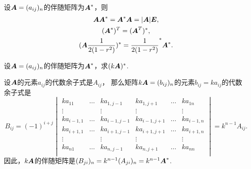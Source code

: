 \begin{theorem}
设\(\boldsymbol{A}=(a_{ij})_n\)的伴随矩阵为\(\boldsymbol{A}^*\)，则\begin{gather}
\boldsymbol{A} \boldsymbol{A}^* = \boldsymbol{A}^* \boldsymbol{A} = \abs{\boldsymbol{A}} \boldsymbol{E}, \label{equation:行列式.伴随矩阵.恒等式1} \\
(\boldsymbol{A}^*)^T = (\boldsymbol{A}^T)^*, \label{equation:行列式.伴随矩阵.恒等式2} \\
(\boldsymbol{A}\frac{1}{2(1-r^2)})^* = \frac{1}{2(1-r^2)}^* \boldsymbol{A}^*. \label{equation:行列式.伴随矩阵.恒等式3}
\end{gather}
\end{theorem}

\begin{example}
设\(\boldsymbol{A}=(a_{ij})_n\)的伴随矩阵为\(\boldsymbol{A}^*\)，求\((k\boldsymbol{A})^*\).
\begin{solution}
设\(\boldsymbol{A}\)的元素\(a_{ij}\)的代数余子式是\(A_{ij}\)，%
那么矩阵\(k\boldsymbol{A} = (b_{ij})_n\)的元素\(b_{ij} = k a_{ij}\)的代数余子式是\[
B_{ij}
= (-1)^{i+j} \begin{vmatrix}
k a_{11} & \dots & k a_{1,j-1} & k a_{1,j+1} & \dots & k a_{1n} \\
\vdots & & \vdots & \vdots & & \vdots \\
k a_{i-1,1} & \dots & k a_{i-1,j-1} & k a_{i-1,j+1} & \dots & k a_{i-1,n} \\
k a_{i+1,1} & \dots & k a_{i+1,j-1} & k a_{i+1,j+1} & \dots & k a_{i+1,n} \\
\vdots & & \vdots & \vdots & & \vdots \\
k a_{n1} & \dots & k a_{n,j-1} & k a_{n,j+1} & \dots & k a_{nn} \\
\end{vmatrix}
= k^{n-1} A_{ij}.
\]
因此，\(k\boldsymbol{A}\)的伴随矩阵是\(
(B_{ji})_n = k^{n-1} (A_{ji})_n
= k^{n-1} \boldsymbol{A}^*
\).
\end{solution}
\end{example}

